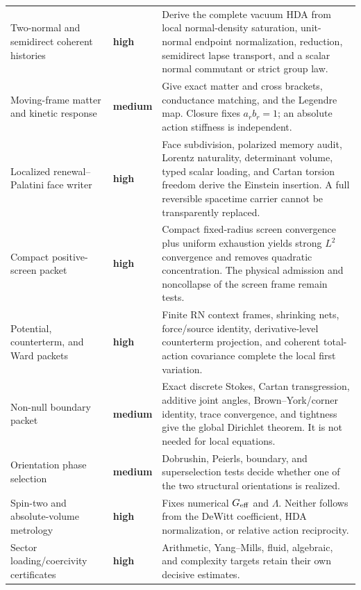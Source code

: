 \documentclass[11pt]{article}
\theoremstyle{definition}
\theoremstyle{remark}
\newcommand{\mediumrisk}{\textcolor{deepblue}{\textbf{medium}}}
\newcommand{\highrisk}{\textcolor{deepred}{\textbf{high}}}
\begin{document}
\begin{longtable}{L{0.22\textwidth}L{0.14\textwidth}L{0.54\textwidth}}
\addlinespace
Two-normal and semidirect coherent histories
& \highrisk
& Derive the complete vacuum HDA from local normal-density saturation, unit-normal endpoint normalization, reduction, semidirect lapse transport, and a scalar normal commutant or strict group law.\\
\addlinespace
Moving-frame matter and kinetic response
& \mediumrisk
& Give exact matter and cross brackets, conductance matching, and the Legendre map.  Closure fixes \(a_rb_r=1\); an absolute action stiffness is independent.\\
\addlinespace
Localized renewal--Palatini face writer
& \highrisk
& Face subdivision, polarized memory audit, Lorentz naturality, determinant volume, typed scalar loading, and Cartan torsion freedom derive the Einstein insertion.  A full reversible spacetime carrier cannot be transparently replaced.\\
\addlinespace
Compact positive-screen packet
& \highrisk
& Compact fixed-radius screen convergence plus uniform exhaustion yields strong \(L^2\) convergence and removes quadratic concentration.  The physical admission and noncollapse of the screen frame remain tests.\\
\addlinespace
Potential, counterterm, and Ward packets
& \highrisk
& Finite RN context frames, shrinking nets, force/source identity, derivative-level counterterm projection, and coherent total-action covariance complete the local first variation.\\
\addlinespace
Non-null boundary packet
& \mediumrisk
& Exact discrete Stokes, Cartan transgression, additive joint angles, Brown--York/corner identity, trace convergence, and tightness give the global Dirichlet theorem.  It is not needed for local equations.\\
\addlinespace
Orientation phase selection
& \mediumrisk
& Dobrushin, Peierls, boundary, and superselection tests decide whether one of the two structural orientations is realized.\\
\addlinespace
Spin-two and absolute-volume metrology
& \highrisk
& Fixes numerical \(G_{\rm eff}\) and \(\Lambda\).  Neither follows from the DeWitt coefficient, HDA normalization, or relative action reciprocity.\\
\addlinespace
Sector loading/coercivity certificates
& \highrisk
& Arithmetic, Yang--Mills, fluid, algebraic, and complexity targets retain their own decisive estimates.\\
\bottomrule
\end{longtable}
\endgroup
\end{document}

